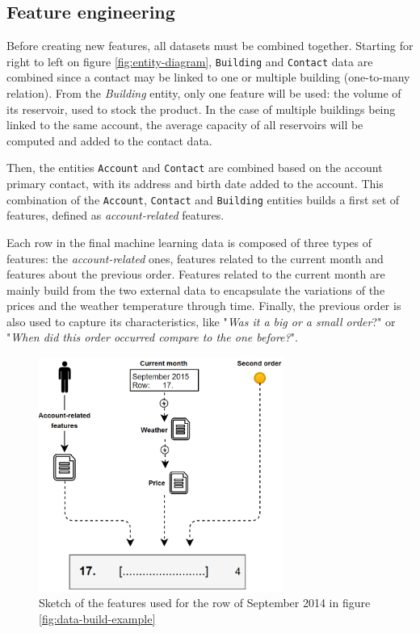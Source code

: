 \subsection{Feature engineering}\label{sec:ml-features}

Before creating new features, all datasets must be combined together. Starting for right to left on figure \ref{fig:entity-diagram}, \texttt{Building} and \texttt{Contact} data are combined since a contact may be linked to one or multiple building (one-to-many relation). From the \textit{Building} entity, only one feature will be used: the volume of its reservoir, used to stock the product. In the case of multiple buildings being linked to the same account, the average capacity of all reservoirs will be computed and added to the contact data. 

Then, the entities \texttt{Account} and \texttt{Contact} are combined based on the account primary contact, with its address and birth date added to the account. This combination of the \texttt{Account}, \texttt{Contact} and \texttt{Building} entities builds a first set of features, defined as \textit{account-related} features.

Each row in the final machine learning data is composed of three types of features: the \textit{account-related} ones, features related to the current month and features about the previous order. Features related to the current month are mainly build from the two external data to encapsulate the variations of the prices and the weather temperature through time. Finally, the previous order is also used to capture its characteristics, like "\textit{Was it a big or a small order}?" or "\textit{When did this order occurred compare to the one before?}".


\begin{figure}[h]
    \centering
    \includegraphics[width=8cm]{images/data-build-ml-example-row.png}
    \caption[Features building for specific month]{Sketch of the features used for the row of September 2014 in figure \ref{fig:data-build-example}}
    \label{fig:data-build-row-example}
\end{figure}

